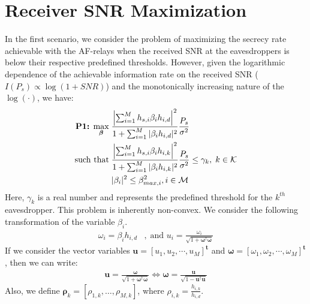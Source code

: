 \documentclass[journal,,draftclsnofoot letterpaper, onecolumn]{IEEEtran}
\begin{document}
\section{Receiver SNR Maximization}
\label{SNR}
In the first scenario, we consider the problem of maximizing the secrecy rate achievable with the AF-relays when the received SNR at the eavesdroppers is below their respective predefined thresholds. However, given the logarithmic dependence of the achievable information rate on the received SNR ($I(P_s) \propto \log(1+SNR)$) and the monotonically increasing nature of the $\log(\cdot)$, we have:
      \begin{subequations}\label{prob2}
      \begin{align}
       \text{\textbf{P1:}}\;\max_{\bm{\beta}} \; & \frac{\left| \sum_{i=1}^{M} h_{s,i}\beta_ih_{i,d}\right| ^2}{1 + \sum_{i=1}^{M}|\beta_i h_{i,d}|^2}\frac{P_s}{\sigma^2} \\
      \text{such that}  \; & \frac{\left| \sum_{i=1}^{M} h_{s,i} \beta_i h_{i,k}\right| ^2}{1 + \sum_{i=1}^{M}|\beta_ih_{i,k}|^2}\frac{P_s}{\sigma^2} \le \gamma_k, \; k \in \mathcal{K}\\
       		                &  |\beta_i|^2 \le \beta_{max,i}^2, i \in \mathcal{M}
      \end{align}
      \end{subequations}
      Here, $\gamma_k$ is a real number and represents the predefined threshold for the $k^{th}$ eavesdropper. This problem is inherently non-convex. We consider the following transformation of the variable $\beta_i$.
\begin{align*}
       \omega_i=\beta_ih_{i,d}&,\;\text{and } u_i=\frac{\omega_i}{\sqrt{1+\bm{\omega}^\dagger\bm{\omega}}}
       \end{align*}
       If we consider the vector variables $\mathbf{u}=[u_1,u_2,\cdots,u_M]^\mathbf{t}$ and $\bm{\omega}=[\omega_1,\omega_2,\cdots,\omega_M]^\mathbf{t}$, then we can write:
       \begin{align*}
        \mathbf{u}=\frac{\bm{\omega}}{\sqrt{1+\bm{\omega}^\dagger\bm{\omega}}} \Leftrightarrow \bm{\omega}=\frac{\mathbf{u}}{\sqrt{1-\mathbf{u^\dagger u}}}
       \end{align*}
Also, we define $\bm{\rho}_k = [\rho_{1,k}, \ldots, \rho_{M,k}]$, where $\rho_{i,k}=\frac{h_{i,k}}{h_{i,d}}$.
\end{document}
